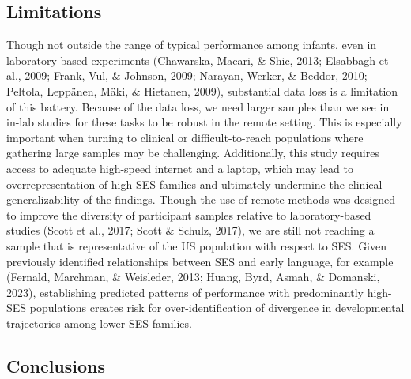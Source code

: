 \documentclass[
  english,
  man,floatsintext]{apa6}
\begin{document}
\subsection{Limitations}\label{limitations}

Though not outside the range of typical performance among infants, even in laboratory-based experiments (Chawarska, Macari, \& Shic, 2013; Elsabbagh et al., 2009; Frank, Vul, \& Johnson, 2009; Narayan, Werker, \& Beddor, 2010; Peltola, Leppänen, Mäki, \& Hietanen, 2009), substantial data loss is a limitation of this battery. Because of the data loss, we need larger samples than we see in in-lab studies for these tasks to be robust in the remote setting. This is especially important when turning to clinical or difficult-to-reach populations where gathering large samples may be challenging. Additionally, this study requires access to adequate high-speed internet and a laptop, which may lead to overrepresentation of high-SES families and ultimately undermine the clinical generalizability of the findings.
Though the use of remote methods was designed to improve the diversity of participant samples relative to laboratory-based studies (Scott et al., 2017; Scott \& Schulz, 2017), we are still not reaching a sample that is representative of the US population with respect to SES.
Given previously identified relationships between SES and early language, for example (Fernald, Marchman, \& Weisleder, 2013; Huang, Byrd, Asmah, \& Domanski, 2023), establishing predicted patterns of performance with predominantly high-SES populations creates risk for over-identification of divergence in developmental trajectories among lower-SES families.

\subsection{Conclusions}\label{conclusions}
\end{document}

